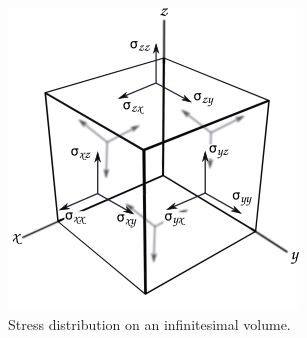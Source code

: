 \begin{figure}[ht]
    \centering
    \includegraphics[width=0.39\linewidth]{Figures/cubefin.png}
    \caption{Stress distribution on an infinitesimal volume.}
    \label{fig:stress}
\end{figure}

